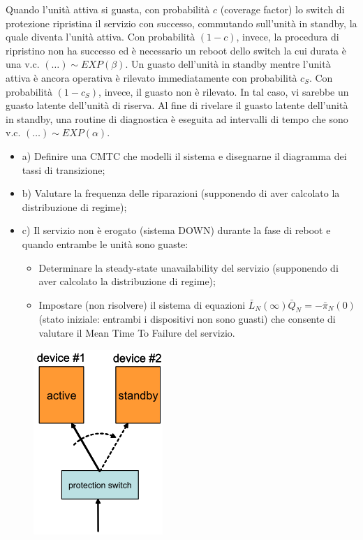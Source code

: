 Quando l’unità attiva si guasta, con probabilità $c$ (coverage factor) lo switch di protezione ripristina il servizio con successo, commutando sull’unità in standby, la quale diventa l’unità attiva. Con probabilità $(1-c)$, invece, la procedura di ripristino non ha successo ed è necessario un reboot dello switch la cui durata è una v.c. $(\dots)\sim EXP(\beta)$. Un guasto dell’unità in standby mentre l’unità attiva è ancora operativa è rilevato immediatamente con probabilità $c_S$. Con probabilità $(1-c_S)$, invece, il guasto non è rilevato. In tal caso, vi sarebbe un guasto latente dell’unità di riserva. Al fine di rivelare il guasto latente dell’unità in standby, una routine di diagnostica è eseguita ad intervalli di tempo che sono v.c. $(\dots)\sim EXP(\alpha)$.

\begin{itemize}

\item{a)} Definire una CMTC che modelli il sistema e disegnarne il diagramma dei tassi di transizione;
\item{b)} Valutare la frequenza delle riparazioni (supponendo di aver calcolato la distribuzione di regime);
\item{c)} Il servizio non è erogato (sistema DOWN) durante la fase di reboot e quando entrambe le unità sono guaste:

\begin{itemize}

\item Determinare la steady-state unavailability del servizio (supponendo di aver calcolato la distribuzione di regime);
\item Impostare (non risolvere) il sistema di equazioni $\bar{L}_N(\infty)\bar{Q}_N = -\bar{\pi}_N(0)$ (stato iniziale: entrambi i dispositivi non sono guasti) che consente di valutare il Mean Time To Failure del servizio.

\end{itemize}

\end{itemize}

\begin{center}
\begin{figure}[H]
\centering
\includegraphics[scale=1]{figures/ex/hw23.png}
\end{figure}
\end{center}

